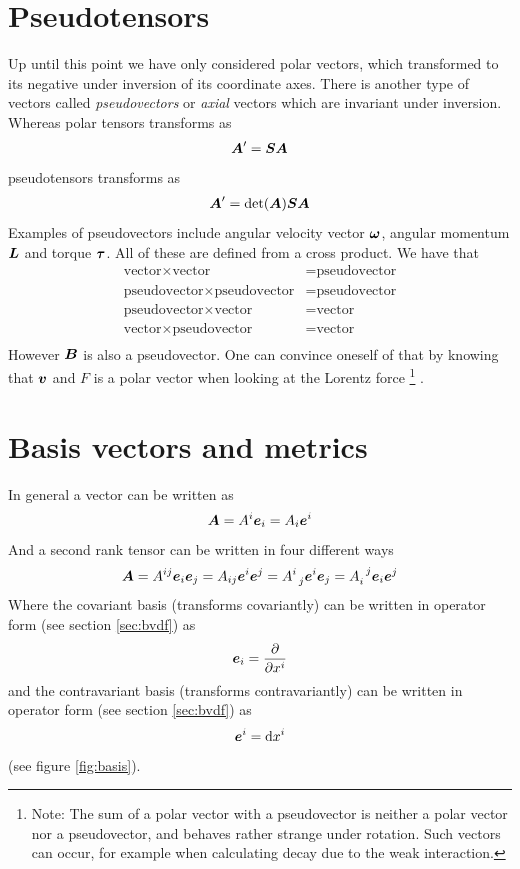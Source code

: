 \documentclass[a4paper, 12pt]{article}
\begin{document}
\section{Pseudotensors}
Up until this point we have only considered polar vectors, which transformed to 
its negative under inversion of its coordinate axes. There is another type of 
vectors called \emph{pseudovectors} or \emph{axial} vectors which are invariant 
under inversion. Whereas polar tensors transforms as
%
\begin{align*}
 \boldsymbol{A}' = \boldsymbol{S}\boldsymbol{A}
\end{align*}
%
pseudotensors transforms as
%
\begin{align*}
 \boldsymbol{A}' = \det(\boldsymbol{A})\boldsymbol{S}\boldsymbol{A}
\end{align*}
%
Examples of pseudovectors include angular velocity vector $\boldsymbol{\omega}$, 
angular momentum $\boldsymbol{L}$ and torque $\boldsymbol{\tau}$. All of these are defined 
from a cross product. We have that
%
\begin{align*}
 \text{vector} \times \text{vector} &= \text{pseudovector}\\
 \text{pseudovector} \times \text{pseudovector} &= \text{pseudovector}\\
 \text{pseudovector} \times \text{vector} &= \text{vector}\\
 \text{vector} \times \text{pseudovector} &= \text{vector}\\
\end{align*}
%
However $\boldsymbol{B}$ is also a pseudovector. One can convince oneself of that by 
knowing that $\boldsymbol{v}$ and $F$ is a polar vector when looking at the Lorentz 
force%
\footnote{Note: The sum of a polar vector with a pseudovector is neither a 
polar vector nor a pseudovector, and behaves rather strange under rotation. 
Such vectors can occur, for example when calculating decay due to the weak 
interaction.}%
.




\section{Basis vectors and metrics}
In general a vector can be written as
%
\begin{align*}
 \boldsymbol{A} = A^i\boldsymbol{e}_i = A_i\boldsymbol{e}^i
\end{align*}
%
And a second rank tensor can be written in four different ways
%
\begin{align*}
 \boldsymbol{A} = 
 A^{ij}\boldsymbol{e}_i\boldsymbol{e}_j =
 A_{ij}\boldsymbol{e}^i\boldsymbol{e}^j =
 A^{i}_{\;\;j}\boldsymbol{e}^i\boldsymbol{e}_j =
 A_{i}^{\;\;j}\boldsymbol{e}_i\boldsymbol{e}^j
\end{align*}
%
Where the covariant basis (transforms covariantly) can be written in operator 
form (see section \ref{sec:bvdf}) as
%
\begin{align}
 \boldsymbol{e}_i = \frac{\partial {}}{\partial{x^i}} \label{eq:cov_basis}
\end{align}
%
and the contravariant basis (transforms contravariantly) can be written in 
operator form (see section \ref{sec:bvdf}) as
%
\begin{align}
 \boldsymbol{e}^i = \text{d}x^i \label{eq:con_basis}
\end{align}
%
(see figure \ref{fig:basis}).
\end{document}
